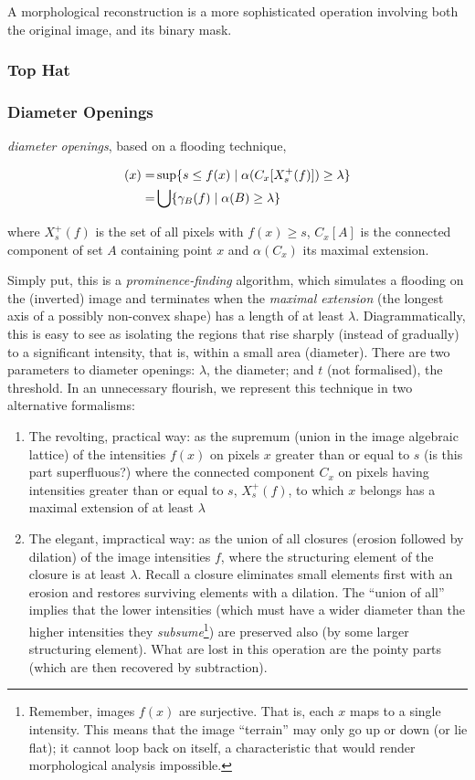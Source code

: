 \documentclass[11pt]{amsart}
\begin{document}
A morphological reconstruction is a more sophisticated operation involving both the original image, and its binary mask.

\subsubsection{Top Hat}
\subsubsection{Diameter Openings}

\emph{diameter openings}, based on a flooding technique,

        \begin{align}
[\gamma^{\circ}_{\lambda}(f)] (x)
=& \sup \{ s \leq f(x) \mid \alpha ( C_x [ X_s^+(f) ] ) \geq \lambda \} \notag \\
=& \bigcup \{ \gamma_B(f) \mid \alpha(B) \geq \lambda \} \notag
\end{align}

where $X_s^+(f)$ is the set of all pixels with $f(x)\geq s$, $C_x[A]$ is the connected component of set $A$ containing point $x$ and $\alpha(C_x)$ its maximal extension.

Simply put, this is a \emph{prominence-finding} algorithm, which simulates a flooding on the (inverted) image and terminates when the \emph{maximal extension} (the longest axis of a possibly non-convex shape) has a length of at least $\lambda$. Diagrammatically, this is easy to see as isolating the regions that rise sharply (instead of gradually) to a significant intensity, that is, within a small area (diameter). There are two parameters to diameter openings: $\lambda$, the diameter; and $t$ (not formalised), the threshold. In an unnecessary flourish, we represent this technique in two alternative formalisms:

\begin{enumerate}
\item The revolting, practical way: as the supremum (union in the image algebraic lattice) of the intensities $f(x)$ on pixels $x$ greater than or equal to $s$ (is this part superfluous?) where the connected component $C_x$ on pixels having intensities greater than or equal to $s$, $X_s^+(f)$, to which $x$ belongs has a maximal extension of at least $\lambda$
\item The elegant, impractical way: as the union of all closures (erosion followed by dilation) of the image intensities $f$, where the structuring element of the closure is at least $\lambda$. Recall a closure eliminates small elements first with an erosion and restores surviving elements with a dilation. The ``union of all'' implies that the lower intensities (which must have a wider diameter than the higher intensities they \emph{subsume}\footnote{Remember, images $f(x)$ are surjective. That is, each $x$ maps to a single intensity. This means that the image ``terrain'' may only go up or down (or lie flat); it cannot loop back on itself, a characteristic that would render morphological analysis impossible.}) are preserved also (by some larger structuring element). What are lost in this operation are the pointy parts (which are then recovered by subtraction).
\end{enumerate}
\end{document}
